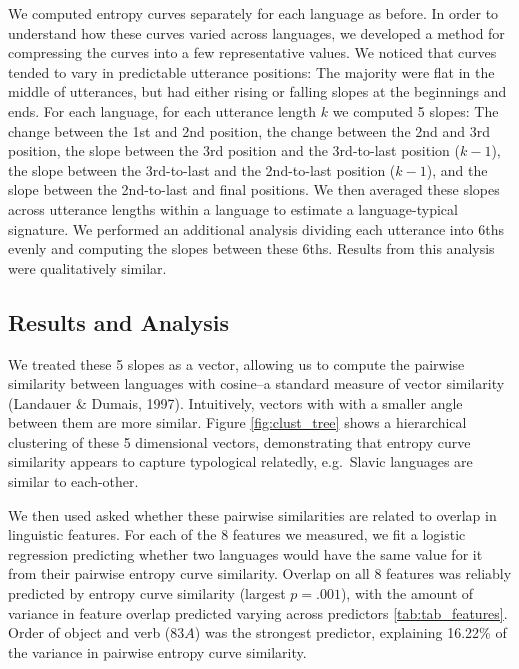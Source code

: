 \documentclass[10pt, letterpaper]{article}
\begin{document}
We computed entropy curves separately for each language as before. In
order to understand how these curves varied across languages, we
developed a method for compressing the curves into a few representative
values. We noticed that curves tended to vary in predictable utterance
positions: The majority were flat in the middle of utterances, but had
either rising or falling slopes at the beginnings and ends. For each
language, for each utterance length \(k\) we computed 5 slopes: The
change between the 1st and 2nd position, the change between the 2nd and
3rd position, the slope between the 3rd position and the 3rd-to-last
position (\(k-1\)), the slope between the 3rd-to-last and the
2nd-to-last position (\(k-1\)), and the slope between the 2nd-to-last
and final positions. We then averaged these slopes across utterance
lengths within a language to estimate a language-typical signature. We
performed an additional analysis dividing each utterance into 6ths
evenly and computing the slopes between these 6ths. Results from this
analysis were qualitatively similar.

\hypertarget{results-and-analysis}{%
\subsection{Results and Analysis}\label{results-and-analysis}}

We treated these 5 slopes as a vector, allowing us to compute the
pairwise similarity between languages with cosine--a standard measure of
vector similarity (Landauer \& Dumais, 1997). Intuitively, vectors with
with a smaller angle between them are more similar. Figure
\ref{fig:clust_tree} shows a hierarchical clustering of these 5
dimensional vectors, demonstrating that entropy curve similarity appears
to capture typological relatedly, e.g.~Slavic languages are similar to
each-other.

We then used asked whether these pairwise similarities are related to
overlap in linguistic features. For each of the 8 features we measured,
we fit a logistic regression predicting whether two languages would have
the same value for it from their pairwise entropy curve similarity.
Overlap on all 8 features was reliably predicted by entropy curve
similarity (largest \(p = .001\)), with the amount of variance in
feature overlap predicted varying across predictors
\ref{tab:tab_features}. Order of object and verb (\(83A\)) was the
strongest predictor, explaining 16.22\% of the variance in pairwise
entropy curve similarity.
\end{document}
